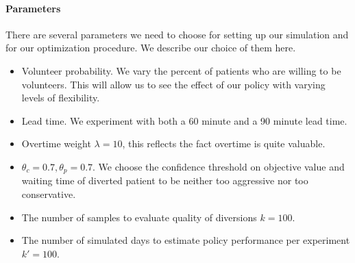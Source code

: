 \paragraph{Parameters}

There are several parameters we need to choose for setting up our simulation
and for our optimization procedure. We describe our choice of them here.

\begin{itemize}
  \item Volunteer probability. We vary the percent of patients who are willing
    to be volunteers. This will allow us to see the effect of our policy
    with varying levels of flexibility.
  \item Lead time. We experiment with both a 60 minute and a 90 minute lead time.
  \item Overtime weight $\lambda = 10$, this reflects the fact overtime is quite valuable.
  \item $\theta_c = 0.7, \theta_p = 0.7$. We choose the confidence threshold on objective value
    and waiting time of diverted patient to be neither too aggressive nor too conservative.
  \item The number of samples to evaluate quality of diversions $k=100$.
  \item The number of simulated days to estimate policy performance per experiment $k'=100$.
\end{itemize}
